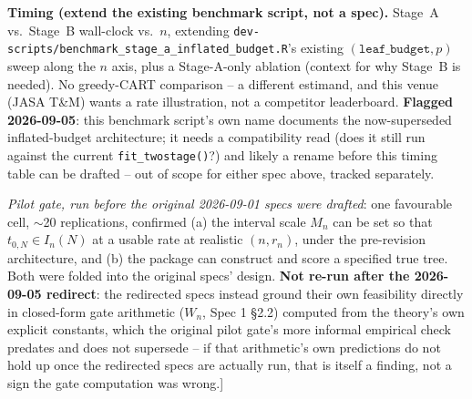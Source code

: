 \documentclass[11pt]{article}
\theoremstyle{plain}
\theoremstyle{definition}
\theoremstyle{remark}
\begin{document}
\textbf{Timing (extend the existing benchmark script, not a spec).}
Stage~A vs.\ Stage~B wall-clock vs.\ $n$, extending
\texttt{dev-scripts/benchmark\_stage\_a\_inflated\_budget.R}'s existing
$(\texttt{leaf\_budget},p)$ sweep along the $n$ axis, plus a
Stage-A-only ablation (context for why Stage~B is needed). No greedy-CART
comparison -- a different estimand, and this venue (JASA T\&M) wants a
rate illustration, not a competitor leaderboard. \textbf{Flagged
2026-09-05}: this benchmark script's own name documents the
now-superseded inflated-budget architecture; it needs a compatibility
read (does it still run against the current \texttt{fit\_twostage()}?)
and likely a rename before this timing table can be drafted -- out of
scope for either spec above, tracked separately.

\emph{Pilot gate, run before the original 2026-09-01 specs were drafted}:
one favourable cell, $\sim$20 replications, confirmed (a) the interval
scale $M_n$ can be set so that $t_{0,N}\in I_n(N)$ at a usable rate at
realistic $(n,r_n)$, under the pre-revision architecture, and (b) the
package can construct and score a specified true tree. Both were
folded into the original specs' design. \textbf{Not re-run after the
2026-09-05 redirect}: the redirected specs instead ground their own
feasibility directly in closed-form gate arithmetic ($W_n$, Spec 1 \S2.2)
computed from the theory's own explicit constants, which the original
pilot gate's more informal empirical check predates and does not
supersede -- if that arithmetic's own predictions do not hold up once the
redirected specs are actually run, that is itself a finding, not a sign
the gate computation was wrong.]
\end{document}
